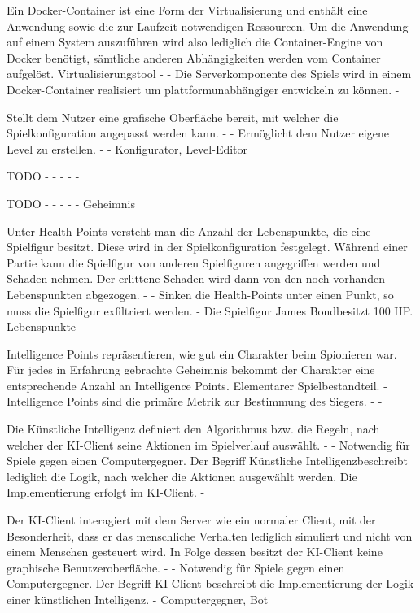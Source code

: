 {Ein Docker-Container ist eine Form der Virtualisierung und enthält eine Anwendung sowie die zur Laufzeit notwendigen Ressourcen. Um die Anwendung auf einem System auszuführen wird also lediglich die Container-Engine von Docker benötigt, sämtliche anderen Abhängigkeiten werden vom Container aufgelöst.}
{Virtualisierungstool}
{-}
{-}
{Die Serverkomponente des Spiels wird in einem Docker-Container realisiert um plattformunabhängiger entwickeln zu können.}
{-}

{Stellt dem Nutzer eine grafische Oberfläche bereit, mit welcher die Spielkonfiguration angepasst werden kann. }
{-}
{-}
{Ermöglicht dem Nutzer eigene Level zu erstellen.}
{-}
{-}
{Konfigurator, Level-Editor}

{TODO}
{-}
{-}
{-}
{-}
{-}

{TODO}
{-}
{-}
{-}
{-}
{-}
{Geheimnis}

{Unter Health-Points versteht man die Anzahl der Lebenspunkte, die eine Spielfigur besitzt. Diese wird in der Spielkonfiguration festgelegt. Während einer Partie kann die Spielfigur von anderen Spielfiguren angegriffen werden und Schaden nehmen. Der erlittene Schaden wird dann von den noch vorhanden Lebenspunkten abgezogen.}
{-}
{-}
{Sinken die Health-Points unter einen Punkt, so muss die Spielfigur exfiltriert werden.}
{-}
{Die Spielfigur \glqq James Bond\grqq besitzt 100 HP.}
{Lebenspunkte}

{Intelligence Points repräsentieren, wie gut ein Charakter beim Spionieren war. Für jedes in Erfahrung gebrachte Geheimnis bekommt der Charakter eine entsprechende Anzahl an Intelligence Points.}
{Elementarer Spielbestandteil.}
{-}
{Intelligence Points sind die primäre Metrik zur Bestimmung des Siegers.}
{-}
{-}

{Die Künstliche Intelligenz definiert den Algorithmus bzw. die Regeln, nach welcher der KI-Client seine Aktionen im Spielverlauf auswählt.}
{-}
{-}
{Notwendig für Spiele gegen einen Computergegner.}
{Der Begriff \glqq Künstliche Intelligenz\grqq beschreibt lediglich die Logik, nach welcher die Aktionen ausgewählt werden. Die Implementierung erfolgt im KI-Client.}
{-}

{Der KI-Client interagiert mit dem Server wie ein normaler Client, mit der Besonderheit, dass er das menschliche Verhalten lediglich simuliert und nicht von einem Menschen gesteuert wird. In Folge dessen besitzt der KI-Client keine graphische Benutzeroberfläche. }
{-}
{-}
{Notwendig für Spiele gegen einen Computergegner.}
{Der Begriff KI-Client beschreibt die Implementierung der Logik einer künstlichen Intelligenz.}
{-}
{Computergegner, Bot}

